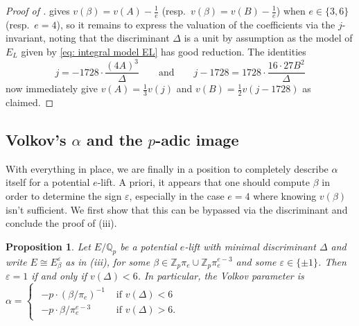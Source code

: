 \documentclass{amsart}
\newtheorem{proposition}[theorem]{Proposition}
\theoremstyle{definition}
\newcommand{\Q}{\mathbb{Q}}
\numberwithin{theorem}{section}
\numberwithin{equation}{section}
\begin{document}
\begin{proof}[Proof of ]
 gives $v(\beta)=v(A)-\frac{1}{e}$ (resp.~$v(\beta)=v(B)-\frac{1}{e}$) when $e \in \{3,6\}$ (resp.~$e=4$), so it remains to express the valuation of the coefficients via the $j$-invariant, noting that the discriminant $\Delta$ is a unit by assumption as the model of $E_L$ given by \eqref{eq: integral model EL} has good reduction.
The identities
\[
j = -1728 \cdot \frac{(4A)^3}{\Delta} \qquad \text{and} \qquad j - 1728 = 1728 \cdot \frac{16 \cdot 27B^2}{\Delta}
\]
now immediately give $v(A)=\frac{1}{3}v(j)$ and $v(B)=\frac{1}{2}v(j-1728)$ as claimed.
\end{proof}

\subsection{Volkov's $\alpha$ and the $p$-adic image}

With everything in place, we are finally in a position to completely describe $\alpha$ itself for a potential $e$-lift. A priori, it appears that one should compute $\beta$ in order to determine the sign $\varepsilon$, especially in the case $e=4$ where knowing $v(\beta)$ isn't sufficient. We first show that this can be bypassed via the discriminant and conclude the proof of (iii).


\begin{proposition}\label{prop: epsilon via discriminant} 
Let $E/\Q_p$ be a potential $e$-lift with minimal discriminant $\Delta$ and write $E \cong E^\varepsilon_\beta$ as in (iii), for some $\beta \in \mathbb{Z}_p \pi_e \cup \mathbb{Z}_p \pi_e^{e-3}$ and some $\varepsilon \in \{ \pm 1 \}$. Then $\varepsilon=1$ if and only if $v(\Delta)<6$. 
In particular, the Volkov parameter is $\alpha = \begin{cases}
\begin{array}{cc}
    -p \cdot (\beta/\pi_e)^{-1} & \text{ if } v(\Delta)<6 \\
    -p \cdot \beta/\pi_e^{e-3} & \text{ if } v(\Delta)>6.
    \end{array}
\end{cases}$
\end{proposition}
\end{document}
